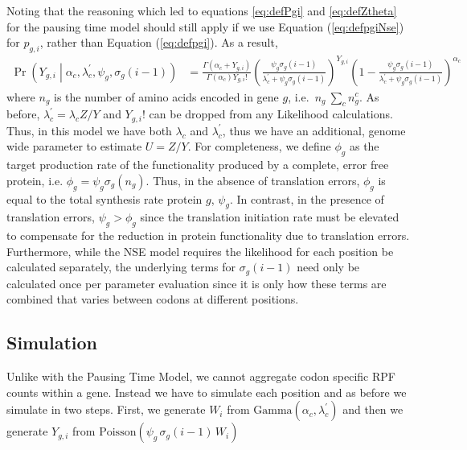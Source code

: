 \documentclass{article}
\newcommand{\alphac}{\ensuremath{{\alpha_c}}\xspace}
\newcommand{\lambdac}{\ensuremath{{\lambda_c}}\xspace}
\newcommand{\lambdacprime}{\ensuremath{{\lambda_c^\prime}}\xspace}
\newcommand{\sigmag}{\ensuremath{\sigma_{g}}\xspace}
\newcommand{\pgi}{\ensuremath{{p_{g,i}}}\xspace}
\newcommand{\ngc}{\ensuremath{{n_{g}^c}}\xspace}
\renewcommand{\ng}{\ensuremath{{n_{g}}}\xspace}
\newcommand{\psig}{\ensuremath{{\psi_g}}\xspace}
\newcommand{\phig}{\ensuremath{{\phi_g}}\xspace}
\newcommand{\Ztheta}{\ensuremath{{Z}}\xspace}
\newcommand{\Ytotal}{\ensuremath{{Y}}\xspace}
\newcommand{\Ygi}{\ensuremath{{Y_{g,i}}}\xspace}
\begin{document}
Noting that the reasoning which led to equations \ref{eq:defPgi} and \ref{eq:defZtheta} for the pausing time model should still apply if we use Equation (\ref{eq:defpgiNse}) for \pgi, rather than Equation (\ref{eq:defpgi}). 
As a result,
\begin{align}
  \label{eq:distYgSiteNse}
  \Pr\left(\Ygi \middle| \alphac, \lambdacprime, \psig, \sigmag(i-1)\right) 
  &= \frac{\Gamma\left(\alphac + \Ygi\right)}{\Gamma\left(\alphac\right) \Ygi!} 
  \left(\frac{\psig \sigmag(i-1)}{\lambdacprime + \psig \sigmag(i-1)}\right)^\Ygi \left(1-\frac{\psig\sigmag(i-1)}{\lambdacprime + \psig \sigmag(i-1)}\right)^\alphac
\end{align}
where \ng is the number of amino acids encoded in gene $g$, i.e.~$\ng \ \sum_c \ngc$.
As before, $\lambdacprime = \lambdac \Ztheta/\Ytotal$ and $\Ygi!$ can be dropped from any Likelihood calculations.
Thus, in this model we have both $\lambdac$ and $\lambdacprime$, thus we have an additional, genome wide parameter to estimate $U = \Ztheta/\Ytotal$.
For completeness, we  define $\phig$ as the target production rate of the functionality produced by a complete, error free protein, i.e. $\phig = \psig \sigmag(\ng)$.
Thus, in the absence of translation errors, $\phig$ is equal to the total synthesis rate protein $g$, $\psig$.
In contrast, in the presence of translation errors, $\psig > \phig$ since the translation initiation rate must be elevated to compensate for the reduction in protein functionality due to translation errors.
Furthermore, while the NSE model requires the likelihood for each position be calculated separately, the underlying terms for $\sigmag(i-1)$ need only be calculated once per parameter evaluation since it is only how these terms are combined that varies between codons at different positions.



\subsection*{Simulation}
Unlike with the Pausing Time Model, we cannot aggregate codon specific RPF counts within a gene.
Instead we have to simulate each position and as before we simulate in two steps.
First, we generate $W_i$  from $\text{Gamma}(\alphac, \lambdacprime)$ and then we generate $\Ygi$ from $\text{Poisson}\left(\psi_g \, \sigmag(i-1)\, W_i\right)$
\end{document}
